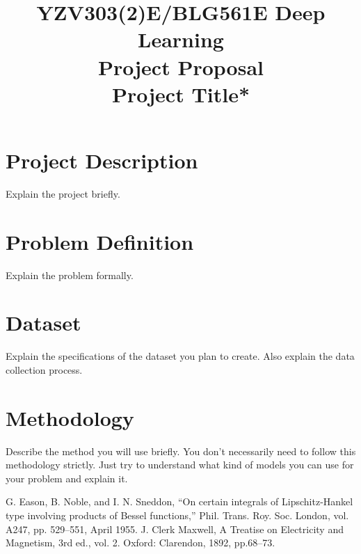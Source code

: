 \documentclass[conference]{IEEEtran}
\begin{document}
\title{
YZV303(2)E/BLG561E  Deep Learning \\ 
Project Proposal\\
Project Title*
}

\author{
\and
{}
}

\maketitle
\vspace{-1cm}
\section{Project Description}
Explain the project briefly.

\section{Problem Definition}
Explain the problem formally.

\section{Dataset}
Explain the specifications of the dataset you plan to create. Also explain the data collection process.

\section{Methodology}
Describe the method you will use briefly. You don't necessarily need to follow this methodology strictly. Just try to understand what kind of models you can use for your problem and explain it.



\begin{thebibliography}{00}
 G. Eason, B. Noble, and I. N. Sneddon, ``On certain integrals of Lipschitz-Hankel type involving products of Bessel functions,'' Phil. Trans. Roy. Soc. London, vol. A247, pp. 529--551, April 1955.
 J. Clerk Maxwell, A Treatise on Electricity and Magnetism, 3rd ed., vol. 2. Oxford: Clarendon, 1892, pp.68--73.
\end{thebibliography}
\end{document}
